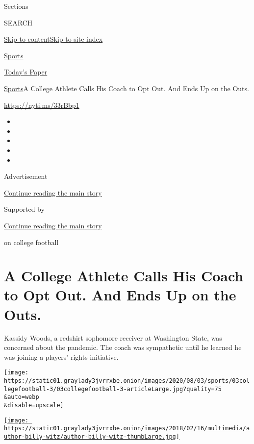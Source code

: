 Sections

SEARCH

\protect\hyperlink{site-content}{Skip to
content}\protect\hyperlink{site-index}{Skip to site index}

\href{https://www.nytimes3xbfgragh.onion/section/sports}{Sports}

\href{https://myaccount.nytimes3xbfgragh.onion/auth/login?response_type=cookie\&client_id=vi}{}

\href{https://www.nytimes3xbfgragh.onion/section/todayspaper}{Today's
Paper}

\href{/section/sports}{Sports}\textbar{}A College Athlete Calls His
Coach to Opt Out. And Ends Up on the Outs.

\url{https://nyti.ms/33rBbp1}

\begin{itemize}
\item
\item
\item
\item
\item
\end{itemize}

Advertisement

\protect\hyperlink{after-top}{Continue reading the main story}

Supported by

\protect\hyperlink{after-sponsor}{Continue reading the main story}

on college football

\hypertarget{a-college-athlete-calls-his-coach-to-opt-out-and-ends-up-on-the-outs}{%
\section{A College Athlete Calls His Coach to Opt Out. And Ends Up on
the
Outs.}\label{a-college-athlete-calls-his-coach-to-opt-out-and-ends-up-on-the-outs}}

Kassidy Woods, a redshirt sophomore receiver at Washington State, was
concerned about the pandemic. The coach was sympathetic until he learned
he was joining a players' rights initiative.

\texttt{[image: https://static01.graylady3jvrrxbe.onion/images/2020/08/03/sports/03collegefootball-3/03collegefootball-3-articleLarge.jpg?quality=75\\\&auto=webp\\\&disable=upscale]}

\href{https://www.nytimes3xbfgragh.onion/by/billy-witz}{\texttt{[image: https://static01.graylady3jvrrxbe.onion/images/2018/02/16/multimedia/author-billy-witz/author-billy-witz-thumbLarge.jpg]}}

